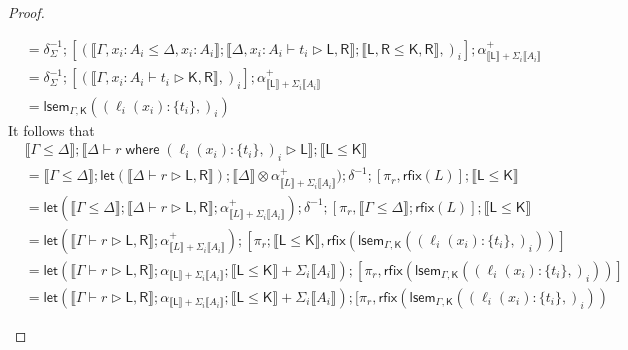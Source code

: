 \documentclass[acmsmall,screen,review]{acmart}
\newcommand{\ms}[1]{\ensuremath{\mathsf{#1}}}
\newcommand{\lto}{:}
\newcommand{\where}[2]{#1\;\ms{where}\;#2}
\newcommand{\wbranch}[3]{#1(#2) \lto \{#3\}}
\newcommand{\bhyp}[2]{#1 : #2}
\newcommand{\haslb}[3]{#1 \vdash #2 \rhd #3}
\newcommand{\dnt}[1]{\llbracket{#1}\rrbracket}
\newcommand{\loopmor}[3]{\ms{lsem}_{#1, #3}(#2)}
\newcommand{\lmor}[1]{\ms{let}(#1)}
\newcommand{\rfix}[1]{\ms{rfix}(#1)}
\begin{document}
\begin{proof}
\begin{itemize}
\begin{equation}
\begin{aligned}
        & = \delta^{-1}_{\Sigma}
          ; [
            (\dnt{\Gamma, \bhyp{x_i}{A_i} \leq \Delta, \bhyp{x_i}{A_i}}
            ; \dnt{\haslb{\Delta, \bhyp{x_i}{A_i}}{t_i}{\ms{L}, \ms{R}}}
            ; \dnt{\ms{L}, \ms{R} \leq \ms{K}, \ms{R}},)_i]
          ; \alpha^+_{\dnt{\ms{L}} + \Sigma_i\dnt{A_i}} \\
        & = \delta^{-1}_{\Sigma}
          ; [(\dnt{\haslb{\Gamma, \bhyp{x_i}{A_i}}{t_i}{\ms{K}, \ms{R}}},)_i]
          ; \alpha^+_{\dnt{\ms{L}} + \Sigma_i\dnt{A_i}} \\
        & = \loopmor{\Gamma}{(\wbranch{\ell_i}{x_i}{t_i},)_i}{\ms{K}}
      \end{aligned}
    \end{equation}
    It follows that
    \begin{equation}
      \begin{aligned}
        & \dnt{\Gamma \leq \Delta} 
          ; \dnt{\haslb{\Delta}{\where{r}{(\wbranch{\ell_i}{x_i}{t_i},)_i}}{\ms{L}}}
          ; \dnt{\ms{L} \leq \ms{K}} \\
        & = \dnt{\Gamma \leq \Delta} 
          ; \lmor{\dnt{\haslb{\Delta}{r}{\ms{L}, \ms{R}}}}  
          ; \dnt{\Delta} \otimes \alpha^+_{\dnt{L} + \Sigma_i\dnt{A_i}})
          ; \delta^{-1}
          ; [\pi_r, \rfix{L}]
          ; \dnt{\ms{L} \leq \ms{K}} \\
        & = \lmor{\dnt{\Gamma \leq \Delta} 
            ; \dnt{\haslb{\Delta}{r}{\ms{L}, \ms{R}}}
            ; \alpha^+_{\dnt{L} + \Sigma_i\dnt{A_i}}}
          ; \delta^{-1}
          ; [\pi_r, \dnt{\Gamma \leq \Delta} ; \rfix{L}]
          ; \dnt{\ms{L} \leq \ms{K}} \\
        & = \lmor{\dnt{\haslb{\Gamma}{r}{\ms{L}, \ms{R}}}; \alpha^+_{\dnt{L} + \Sigma_i\dnt{A_i}}}
          ; [ \pi_r ; \dnt{\ms{L} \leq \ms{K}}, 
              \rfix{\loopmor{\Gamma}{(\wbranch{\ell_i}{x_i}{t_i},)_i}{\ms{K}}}
          ]
          \\
        & = \lmor{\dnt{\haslb{\Gamma}{r}{\ms{L}, \ms{R}}} 
            ; \alpha_{\dnt{\ms{L}} + \Sigma_i\dnt{A_i}}
            ; \dnt{\ms{L} \leq \ms{K}} + \Sigma_i\dnt{A_i}}
          ; [ \pi_r, 
              \rfix{\loopmor{\Gamma}{(\wbranch{\ell_i}{x_i}{t_i},)_i}{\ms{K}}}
          ]
          \\
        & = \lmor{\dnt{\haslb{\Gamma}{r}{\ms{L}, \ms{R}}} 
            ; \alpha_{\dnt{\ms{L}} + \Sigma_i\dnt{A_i}}
            ; \dnt{\ms{L} \leq \ms{K}} + \Sigma_i\dnt{A_i}}
          ; [ \pi_r, 
              \rfix{\loopmor{\Gamma}{(\wbranch{\ell_i}{x_i}{t_i},)_i}{\ms{K}}}

\end{aligned}
\end{equation}
\end{itemize}
\end{proof}
\end{document}
